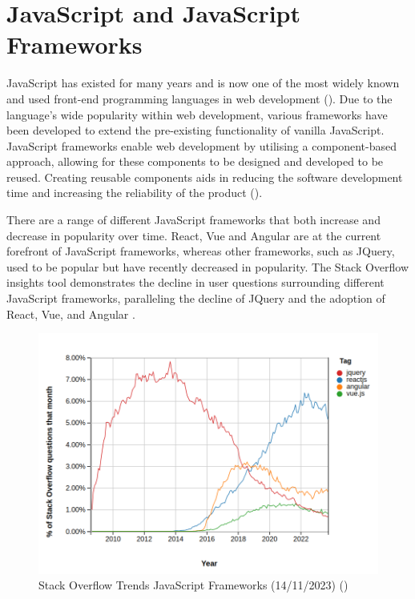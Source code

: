 \section{JavaScript and JavaScript Frameworks}
\label{litrev:javascript}
JavaScript has existed for many years and is now one of the most widely known and used front-end programming languages in web development (\cite{mariano_benchmarking_nodate}). Due to the language's wide popularity within web development, various frameworks have been developed to extend the pre-existing functionality of vanilla JavaScript. JavaScript frameworks enable web development by utilising a component-based approach, allowing for these components to be designed and developed to be reused. Creating reusable components aids in reducing the software development time and increasing the reliability of the product (\cite{crnkovic_challenges_2002}).

There are a range of different JavaScript frameworks that both increase and decrease in popularity over time. React, Vue and Angular are at the current forefront of JavaScript frameworks, whereas other frameworks, such as JQuery, used to be popular but have recently decreased in popularity. The Stack Overflow insights tool demonstrates the decline in user questions surrounding different JavaScript frameworks, paralleling the decline of JQuery and the adoption of React, Vue, and Angular .

\begin{figure}
    \centering
    \includegraphics[width=0.9\linewidth]{figures/so-trends.png}
    \caption{Stack Overflow Trends JavaScript Frameworks (14/11/2023) (\cite{noauthor_stack_nodate})}
    \label{fig:so-trends}
\end{figure}

